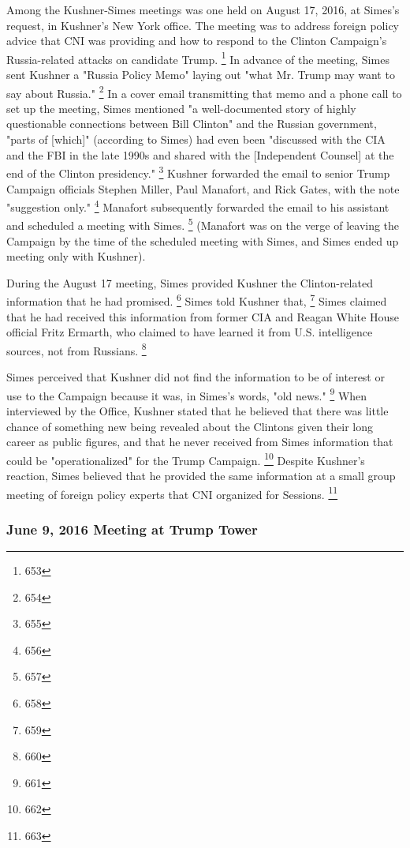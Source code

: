 Among the Kushner-Simes meetings was one held on August 17, 2016, at Simes's request, in Kushner's New York office.
The meeting was to address foreign policy advice that CNI was providing and how to respond to the Clinton Campaign's Russia-related attacks on candidate Trump.%
\footnote{653}
In advance of the meeting, Simes sent Kushner a "Russia Policy Memo" laying out "what Mr. Trump may want to say about Russia."%
\footnote{654}
In a cover email transmitting that memo and a phone call to set up the meeting, Simes mentioned "a well-documented story of highly questionable connections between Bill Clinton" and the Russian government, "parts of [which]" (according to Simes) had even been "discussed with the CIA and the FBI in the late 1990s and shared with the [Independent Counsel] at the end of the Clinton presidency."%
\footnote{655}
Kushner forwarded the email to senior Trump Campaign officials Stephen Miller, Paul Manafort, and Rick Gates, with the note "suggestion only."%
\footnote{656}
Manafort subsequently forwarded the email to his assistant and scheduled a meeting with Simes.%
\footnote{657}
(Manafort was on the verge of leaving the Campaign by the time of the scheduled meeting with Simes, and Simes ended up meeting only with Kushner).

During the August 17 meeting, Simes provided Kushner the Clinton-related information that he had promised.%
\footnote{658}
Simes told Kushner that,
\footnote{659}
Simes claimed that he had received this information from former CIA and Reagan White House official Fritz Ermarth, who claimed to have learned it from U.S. intelligence sources, not from Russians.%
\footnote{660}

Simes perceived that Kushner did not find the information to be of interest or use to the Campaign because it was, in Simes's words, "old news."%
\footnote{661}
When interviewed by the Office, Kushner stated that he believed that there was little chance of something new being revealed about the Clintons given their long career as public figures, and that he never received from Simes information that could be "operationalized" for the Trump Campaign.%
\footnote{662}
Despite Kushner's reaction, Simes believed that he provided the same information at a small group meeting of foreign policy experts that CNI organized for Sessions.%
\footnote{663}

\subsubsection{June 9, 2016 Meeting at Trump Tower}

